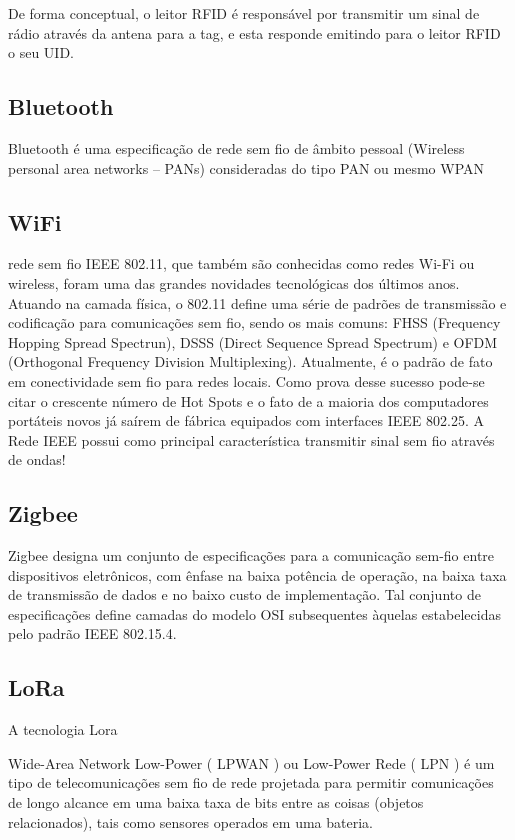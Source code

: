 De forma conceptual, o leitor \ac{RFID} é responsável por transmitir um sinal de rádio através da antena para a tag, e esta responde emitindo para o leitor \ac{RFID} o seu \ac{UID}.


\subsection{Bluetooth}

Bluetooth é uma especificação de rede sem fio de âmbito pessoal (Wireless personal area networks – PANs) consideradas do tipo PAN ou mesmo WPAN


\subsection{WiFi}

rede sem fio IEEE 802.11, que também são conhecidas como redes Wi-Fi ou wireless, foram uma das grandes novidades tecnológicas dos últimos anos. Atuando na camada física, o 802.11 define uma série de padrões de transmissão e codificação para comunicações sem fio, sendo os mais comuns: FHSS (Frequency Hopping Spread Spectrun), DSSS (Direct Sequence Spread Spectrum) e OFDM (Orthogonal Frequency Division Multiplexing). Atualmente, é o padrão de fato em conectividade sem fio para redes locais. Como prova desse sucesso pode-se citar o crescente número de Hot Spots e o fato de a maioria dos computadores portáteis novos já saírem de fábrica equipados com interfaces IEEE 802.25. A Rede IEEE possui como principal característica transmitir sinal sem fio através de ondas!


\subsection{Zigbee}

Zigbee designa um conjunto de especificações para a comunicação sem-fio entre dispositivos eletrônicos, com ênfase na baixa potência de operação, na baixa taxa de transmissão de dados e no baixo custo de implementação. Tal conjunto de especificações define camadas do modelo OSI subsequentes àquelas estabelecidas pelo padrão IEEE 802.15.4.


\subsection{LoRa}

A tecnologia Lora

Wide-Area Network Low-Power ( LPWAN ) ou Low-Power Rede ( LPN ) é um tipo de telecomunicações sem fio de rede projetada para permitir comunicações de longo alcance em uma baixa taxa de bits entre as coisas (objetos relacionados), tais como sensores operados em uma bateria.

